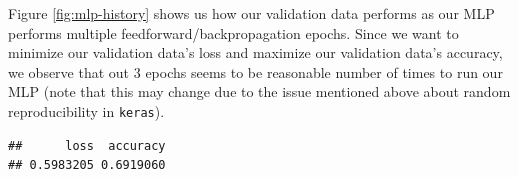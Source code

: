 \documentclass[12pt]{article}
\newenvironment{Shaded}{\begin{snugshade}}{\end{snugshade}}
\newcommand{\DataTypeTok}[1]{\textcolor[rgb]{0.13,0.29,0.53}{#1}}
\newcommand{\DecValTok}[1]{\textcolor[rgb]{0.00,0.00,0.81}{#1}}
\newcommand{\KeywordTok}[1]{\textcolor[rgb]{0.13,0.29,0.53}{\textbf{#1}}}
\newcommand{\NormalTok}[1]{#1}
\newcommand{\OperatorTok}[1]{\textcolor[rgb]{0.81,0.36,0.00}{\textbf{#1}}}
\newcommand{\StringTok}[1]{\textcolor[rgb]{0.31,0.60,0.02}{#1}}
\begin{document}
Figure \ref{fig:mlp-history} shows us how our validation data performs
as our MLP performs multiple feedforward/backpropagation epochs. Since
we want to minimize our validation data's loss and maximize our
validation data's accuracy, we observe that out \(3\) epochs seems to be
reasonable number of times to run our MLP (note that this may change due
to the issue mentioned above about random reproducibility in
\texttt{keras}).

\begin{Shaded}
\end{Shaded}

\begin{verbatim}
##      loss  accuracy 
## 0.5983205 0.6919060
\end{verbatim}
\end{document}
